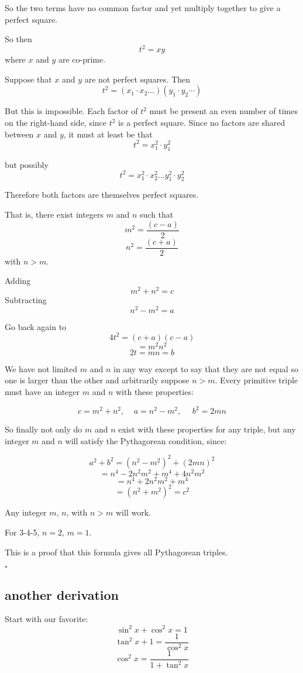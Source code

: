 \documentclass[11pt, oneside]{article}
\begin{document}
So the two terms have no common factor and yet multiply together to give a perfect square.

So then
\[ t^2 = xy \]
where $x$ and $y$ are co-prime. 

Suppose that $x$ and $y$ are not perfect squares.  Then
\[ t^2 = (x_1 \cdot x_2 \dots) (y_1 \cdot y_2 \cdots) \]

But this is impossible.  Each factor of $t^2$ must be present an even number of times on the right-hand side, since $t^2$ is a perfect square.  Since no factors are shared between $x$ and $y$, it must at least be that
\[ t^2 = x_1^2 \cdot y_1^2 \]

but possibly
\[ t^2 = x_1^2 \cdot x_2^2 \dots y_1^2 \cdot y_2^2 \]

Therefore both factors are themselves perfect squares.  

That is, there exist integers $m$ and $n$ such that
\[ m^2 =  \frac{(c - a)}{2} \]
\[ n^2 =  \frac{(c + a)}{2} \]
with $n > m$.

Adding
\[ m^2 + n^2 = c \]
Subtracting
\[ n^2 - m^2 = a \]

Go back again to
\[ 4t^2 = (c + a)(c - a) \]
\[ = m^2 n^2 \]
\[ 2t = mn = b \]

We have not limited $m$ and $n$ in any way except to say that they are not equal so one is larger than the other and arbitrarily suppose $n > m$.  Every primitive triple must have an integer $m$ and $n$ with these properties:

\[ c = m^2 + n^2, \ \ \ \ \ a = n^2 - m^2, \ \ \ \ \ \ b^2 = 2mn \]

So finally not only do $m$ and $n$ exist with these properties for any triple, but any integer $m$ and $n$ will satisfy the Pythagorean condition, since:

\[ a^2 + b^2 = (n^2 - m^2)^2 + (2mn)^2 \]
\[ = n^4 - 2n^2m^2 + m^4 + 4n^2m^2 \]
\[ = n^4 + 2n^2m^2 + m^4 \]
\[ = (n^2 + m^2)^2 = c^2 \]

Any integer $m$, $n$, with $n > m$ will work.

For 3-4-5, $n = 2$, $m=1$.

This is a proof that this formula gives all Pythagorean triples.

$\square$

\subsection*{another derivation}

Start with our favorite:
\[ \sin^2 x + \cos^2 x = 1 \]
\[ \tan^2 x + 1 = \frac{1}{\cos^2 x} \]
\[ \cos^2 x = \frac{1}{1 + \tan^2 x} \]
\end{document}
